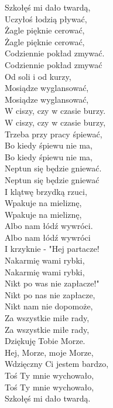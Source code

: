 \begin{multicols}{2}
Szkołęś mi dało twardą, \\
Uczyłoś łodzią pływać, \\
Żagle pięknie cerować, \\
Żagle pięknie cerować, \\
Codziennie pokład zmywać. \\

Codziennie pokład zmywać \\
Od soli i od kurzy, \\
Mosiądze wyglansować, \\
Mosiądze wyglansować, \\
W ciszy, czy w czasie burzy. \\

W ciszy, czy w czasie burzy, \\
Trzeba przy pracy śpiewać, \\
Bo kiedy śpiewu nie ma, \\
Bo kiedy śpiewu nie ma, \\
Neptun się będzie gniewać. \\

\newcolumn
Neptun się będzie gniewać \\
I klątwę brzydką rzuci, \\
Wpakuje na mieliznę, \\
Wpakuje na mieliznę, \\
Albo nam łódź wywróci. \\

Albo nam łódź wywróci \\
I krzyknie - "Hej partacze! \\
Nakarmię wami rybki, \\
Nakarmię wami rybki, \\
Nikt po was nie zapłacze!" \\

Nikt po nas nie zapłacze, \\
Nikt nam nie dopomoże, \\
Za wszystkie miłe rady, \\
Za wszystkie miłe rady, \\
Dziękuję Tobie Morze. \\

Hej, Morze, moje Morze, \\
Wdzięczny Ci jestem bardzo, \\
Toś Ty mnie wychowało, \\
Toś Ty mnie wychowało, \\
Szkołęś mi dało twardą.
\end{multicols}